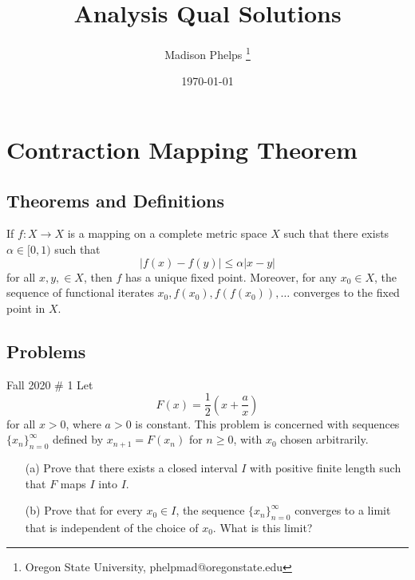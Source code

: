 \documentclass{article}
\title{Analysis Qual Solutions}
\author{Madison Phelps \thanks{Oregon State University, phelpmad@oregonstate.edu}}
\date{\today}
\begin{document}
\maketitle

\thispagestyle{empty}

\break

\tableofcontents

\thispagestyle{empty}

\break

\section{Contraction Mapping Theorem}

\subsection{Theorems and Definitions}

\begin{theorem}\label{thm:banach-fixed-point}
	If $f: X\to X$ is a mapping on a complete metric space $X$ such that there exists $\alpha \in [0,1)$ such that 
	\[|f(x) - f(y)|\leq \alpha |x-y|\]
	for all $x,y,\in X$, then $f$ has a unique fixed point. Moreover, for any $x_0\in X$, the sequence of functional iterates 
	$x_0, f(x_0), f(f(x_0)),\dots$ converges to the fixed point in $X$. 
\end{theorem}

\break

\subsection{Problems}

\begin{problem}{Fall 2020 \# 1} Let 
	\[F(x) = \frac{1}{2}\left(x + \frac{a}{x}\right)\]
		for all $x>0$, where $a>0$ is constant. 
		This problem is concerned with sequences $\{x_n\}_{n=0}^\infty$ 
		defined by $x_{n+1} = F(x_n)$ for $n\geq 0$, with $x_0$ chosen arbitrarily.
	\begin{enumerate}
		\item[(a)] Prove that there exists a closed interval $I$ with positive finite length such that $F$ maps $I$ into $I$.
		
		\item[(b)] Prove that for every $x_0\in I$, the sequence $\{x_n\}_{n=0}^\infty$ converges to a limit 
			that is independent of the choice of $x_0$. What is this limit?
	\end{enumerate}
\end{problem}
\end{document}
